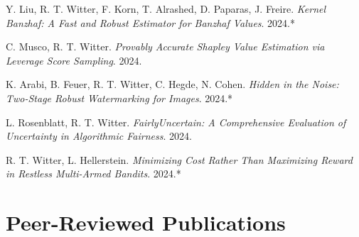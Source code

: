 \documentclass[11pt,a4paper,sans]{moderncv}
\begin{document}
\begin{enumerate}[label={[\arabic*]},align=left]
    \item Y. Liu, R. T. Witter, F. Korn, T. Alrashed, D. Paparas, J. Freire. \textit{Kernel Banzhaf: A Fast and Robust Estimator for Banzhaf Values}. 2024.*
    \item C. Musco, R. T. Witter. \textit{Provably Accurate Shapley Value Estimation via Leverage Score Sampling}. 2024.
    \item K. Arabi, B. Feuer, R. T. Witter, C. Hegde, N. Cohen. \textit{Hidden in the Noise: Two-Stage Robust Watermarking for Images}. 2024.*
    \item L. Rosenblatt, R. T. Witter. \textit{FairlyUncertain: A Comprehensive Evaluation of Uncertainty in Algorithmic Fairness}. 2024.
    \item R. T. Witter, L. Hellerstein. \textit{Minimizing Cost Rather Than Maximizing Reward in Restless Multi-Armed Bandits}. 2024.*
\end{enumerate}


\section{Peer-Reviewed Publications}
\end{document}

